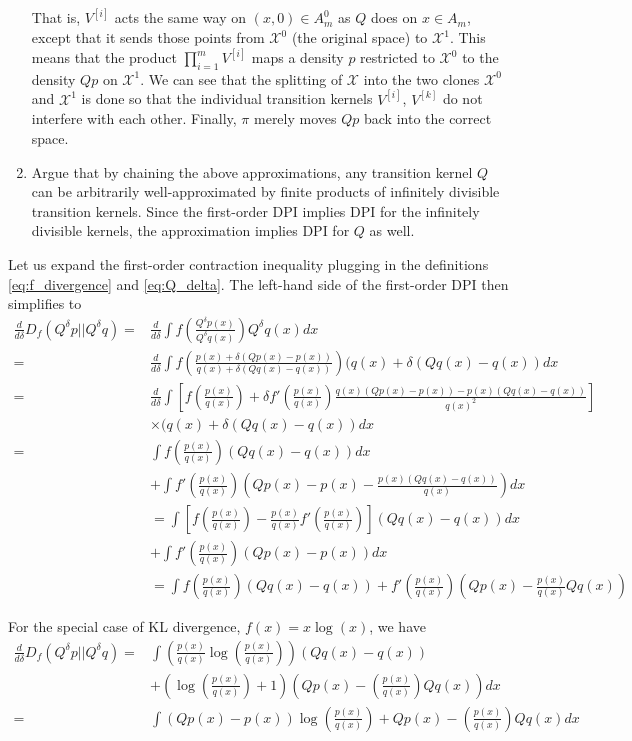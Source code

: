\documentclass[12pt]{article}
\begin{document}
\begin{enumerate}
\[\]
That is, $V^{[i]}$ acts the same way on $(x,0) \in A_m^0$ as $Q$ does
on $x \in A_m$, except that it sends those points from $\mathcal{X}^0$
(the original space) to $\mathcal{X}^1$.  This means that the product
$\prod_{i=1}^m V^{[i]}$ maps a density $p$ restricted to
$\mathcal{X}^0$ to the density $Qp$ on $\mathcal{X}^1$.  We can see
that the splitting of $\mathcal{X}$ into the two clones
$\mathcal{X}^0$ and $\mathcal{X}^1$ is done so that the individual
transition kernels $V^{[i]}$, $V^{[k]}$ do not interfere with each
other.  Finally, $\pi$ merely moves $Qp$ back into the correct space.
\item 
Argue that by chaining the above approximations, any transition kernel
$Q$ can be arbitrarily well-approximated by finite products of
infinitely divisible transition kernels.  Since the first-order DPI
implies DPI for the infinitely divisible kernels, the approximation
implies DPI for $Q$ as well.
\end{enumerate}

Let us expand the first-order contraction inequality plugging in the
definitions \eqref{eq:f_divergence} and \eqref{eq:Q_delta}.  The left-hand side of the first-order DPI then simplifies to
\begin{align*}
\frac{d}{d\delta} D_f(Q^\delta p||Q^\delta q)
=& \frac{d}{d\delta}\int f\left(\frac{Q^\delta p(x)}{Q^\delta q(x)}\right) Q^\delta q(x) dx \\
=& \frac{d}{d\delta}\int f\left(\frac{p(x) + \delta(Qp(x) - p(x))}{q(x) + \delta(Qq(x) - q(x))}\right) (q(x) + \delta (Qq(x)-q(x)) dx \\
=& \frac{d}{d\delta}\int \left[f\left(\frac{p(x)}{q(x)}\right) + \delta f'\left(\frac{p(x)}{q(x)}\right) \frac{q(x)(Qp(x) - p(x)) - p(x) (Qq(x) - q(x))}{q(x)^2}\right]\\
&\times (q(x) + \delta (Qq(x)-q(x)) dx\\
=& \int f\left(\frac{p(x)}{q(x)}\right) (Qq(x)-q(x)) dx \\
&+ \int f'\left(\frac{p(x)}{q(x)}\right) \left(Qp(x) - p(x) - \frac{p(x) (Qq(x) - q(x))}{q(x)}\right)  dx
\\&=  \int \left[f\left(\frac{p(x)}{q(x)}\right) - \frac{p(x)}{q(x)}f'\left(\frac{p(x)}{q(x)}\right) \right] (Qq(x)-q(x)) dx\\
&+ \int f'\left(\frac{p(x)}{q(x)}\right) (Qp(x) - p(x))  dx
\\&= \int f\left(\frac{p(x)}{q(x)}\right) (Qq(x) - q(x)) + f'\left(\frac{p(x)}{q(x)}\right) \left( Qp(x) - \frac{p(x)}{q(x)}Qq(x) \right)
\end{align*}

For the special case of KL divergence, $f(x) = x\log(x)$, we have
\begin{align*}
\frac{d}{d\delta} D_f(Q^\delta p||Q^\delta q)
=& \int \left(\frac{p(x)}{q(x)} \log\left(\frac{p(x)}{q(x)}\right)\right)(Qq(x) - q(x)) 
\\&+ \left(\log\left(\frac{p(x)}{q(x)}\right) + 1\right)\left(Qp(x) - \left(\frac{p(x)}{q(x)}\right) Qq(x)\right) dx
\\=& \int (Qp(x) - p(x)) \log\left(\frac{p(x)}{q(x)}\right) + Qp(x) - \left(\frac{p(x)}{q(x)}\right) Qq(x) dx
\end{align*}
\end{document}
